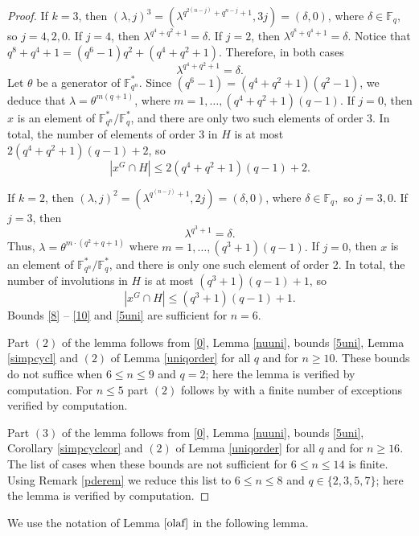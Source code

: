 \begin{proof}
If $k=3$, then   $(\lambda,j)^3=(\lambda^{q^{2(n-j)} +q^{n-j}+1},3j)=(\delta,0)$, where $\delta \in \mathbb{F}_q,$ so   $j=4,2,0.$ 
 If $j=4$, then $\lambda^{q^4+q^2+1}=\delta$. If 
$j=2$, then $\lambda^{q^8+q^4+1}=\delta$. Notice that $q^8 +q^4 +1= (q^6-1)q^2 + (q^4+q^2+1)$. Therefore, in both cases  $$\lambda^{q^4+q^2+1}=\delta.$$ Let $\theta$ be a generator of $\mathbb{F}_{q^n}^*$. Since  $(q^6-1)=(q^4+q^2+1)(q^2-1)$, we deduce that  $\lambda = \theta^{m(q+1)}$, where $m=1, \ldots, (q^4 +q^2+1)(q-1).$ 
If $j=0$, then 
$x$ is an element of  $\mathbb{F}_{q^n}^*/\mathbb{F}_q^*$, and there are only two such elements of order 3. 
 In total, the number of elements of order 3 in $H$  is at most $2(q^4+q^2+1)(q-1)+2$,
 so 
\begin{equation}\label{9}
|x^G \cap H|\le 2(q^4+q^2+1)(q-1)+2.
\end{equation}

If $k=2$, then $(\lambda, j)^2=(\lambda^{q^{(n-j)}+1}, 2j)=(\delta,0)$, where $\delta \in \mathbb{F}_q,$ so $j=3,0.$  If $j=3$, then $$\lambda^{q^3+1}=\delta.$$ Thus, $\lambda= \theta^{m\cdot(q^2+q+1)}$ where $m=1, \ldots, (q^3+1)(q-1).$
If $j=0$, then 
$x$ is an element of  $\mathbb{F}_{q^n}^*/\mathbb{F}_q^*$, and there is only one such element of order 2.
 In total,  the number of involutions in $H$ is at most  $(q^3+1)(q-1)+1$,
 so 
\begin{equation}\label{10}
|x^G \cap H|\le (q^3+1)(q-1)+1.
\end{equation}
 Bounds \eqref{8} -- \eqref{10} and \eqref{5uni} are sufficient for $n=6.$ 

Part $(2)$ of the lemma follows from \eqref{0}, Lemma \ref{nuuni}, bounds  \eqref{5uni}, Lemma \ref{simpcycl} and $(2)$ of Lemma \ref{uniqorder} for all $q$ and for $n \ge 10$. These bounds do not suffice when $6 \le n \le 9$ and $q=2$; here the lemma is verified by computation.  
For  $n \le 5$  part $(2)$ follows by \cite[Table 2]{burness} with a finite number of exceptions verified by computation. 

Part $(3)$ of the lemma follows from \eqref{0}, Lemma \ref{nuuni}, bounds  \eqref{5uni}, Corollary \ref{simpcyclcor} and $(2)$ of Lemma \ref{uniqorder} for all $q$ and for $n \ge 16$. The list of cases when these bounds are not sufficient for $6 \le n \le 14$ is finite. Using Remark \ref{pderem} we reduce this list to  $6 \le n \le 8$ and $q \in \{2,3,5,7\}$; here the lemma is verified by computation.  
\end{proof}

We use the notation of Lemma $\ref{olaf}$ in the following lemma.

